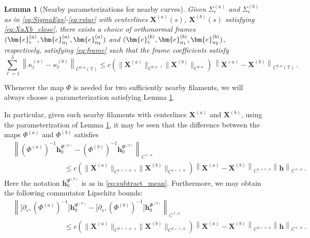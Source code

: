 \documentclass[11pt,reqno]{amsart}
\newcommand{\T}{\mathbb{T}}
\newcommand{\X}{\bm{X}}
\newcommand{\be}{\bm{e}}
\newcommand{\p}{\partial}
\newcommand{\norm}[1]{\left\lVert #1 \right\rVert}
\newtheorem{lemma}[theorem]{Lemma}
\theoremstyle{definition}
\begin{document}
\begin{lemma}[Nearby parameterizations for nearby curves]\label{lem:XaXb_C2beta}
Given $\Sigma_\epsilon^{(a)}$ and $\Sigma_\epsilon^{(b)}$ as in \eqref{eq:SigmaEps}-\eqref{eq:rstar} with centerlines $\X^{(a)}(s)$, $\X^{(b)}(s)$ satisfying \eqref{eq:XaXb_close}, there exists a choice of orthonormal frames $(\be_{\rm t}^{(a)},\be_{\rm n_1}^{(a)},\be_{\rm n_2}^{(a)})$ and $(\be_{\rm t}^{(b)},\be_{\rm n_1}^{(b)},\be_{\rm n_2}^{(b)})$, respectively, satisfying \eqref{eq:frame} such that the frame coefficients satisfy
\begin{equation}\label{eq:XaXb_C2beta}
\sum_{\ell=1}^3\norm{\kappa_\ell^{(a)}-\kappa_\ell^{(b)}}_{C^{0,\alpha}(\T)} \le c(\|\X^{(a)}\|_{C^{2,\alpha}},\|\X^{(b)}\|_{C^{2,\alpha}})\,\norm{\X^{(a)}-\X^{(b)}}_{C^{2,\alpha}(\T)}\,.
\end{equation}
\end{lemma}
%
%
Whenever the map $\Phi$ is needed for two sufficiently nearby filaments, we will always choose a parameterization satisfying Lemma \ref{lem:XaXb_C2beta}.


In particular, given such nearby filaments with centerlines $\X^{(a)}$ and $\X^{(b)}$, using the parameterization of Lemma \ref{lem:XaXb_C2beta}, it may be seen that the difference between the maps $\Phi^{(a)}$ and $\Phi^{(b)}$ satisfies
\begin{equation}\label{eq:Phi_lip_est}
\begin{aligned}
%
&\norm{(\Phi^{(a)})^{-1}\bm{h}_0^{\Phi^{(a)}}-(\Phi^{(b)})^{-1}\bm{h}_0^{\Phi^{(b)}}}_{C^{\ell,\alpha}} \\
&\hspace{3cm} \le c(\|\X^{(a)}\|_{C^{1+\ell,\alpha}},\|\X^{(b)}\|_{C^{1+\ell,\alpha}})\norm{\X^{(a)}-\X^{(b)}}_{C^{1+\ell,\alpha}}\norm{\bm{h}}_{C^{\ell,\alpha}} \,.
\end{aligned}
\end{equation}
Here the notation $\bm{h}_0^{\Phi^{(a)}}$ is as in \eqref{eq:subtract_mean}.
Furthermore, we may obtain the following commutator Lipschitz bounds:
\begin{equation}\label{eq:Phi_comm_lip_est}
\begin{aligned}
%
&\norm{\big[\p_s,(\Phi^{(a)})^{-1}\big]\bm{h}_0^{\Phi^{(a)}}-\big[\p_s,(\Phi^{(b)})^{-1}\big]\bm{h}_0^{\Phi^{(b)}}}_{C^{\ell,\alpha}}\\ 
&\hspace{3cm}\le c(\|\X^{(a)}\|_{C^{2+\ell,\alpha}},\|\X^{(b)}\|_{C^{2+\ell,\alpha}})\norm{\X^{(a)}-\X^{(b)}}_{C^{2+\ell,\alpha}}\norm{\bm{h}}_{C^{\ell,\alpha}} \,.
\end{aligned}
\end{equation}
\end{document}
